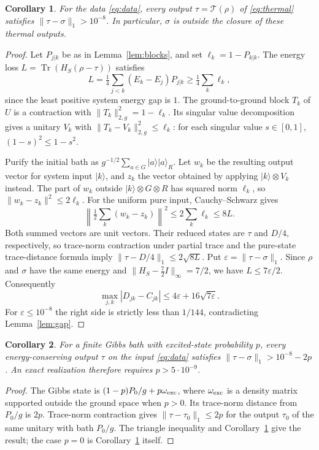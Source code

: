 \documentclass[11pt]{article}
\newtheorem{corollary}{Corollary}
\newcommand{\Tr}{\operatorname{Tr}}
\newcommand{\ket}[1]{\lvert #1\rangle}
\begin{document}
\begin{corollary}\label{cor:robust}
For the data \eqref{eq:data}, every output $\tau=\mathcal T(\rho)$
of \eqref{eq:thermal} satisfies $\|\tau-\sigma\|_1>10^{-8}$.
In particular, $\sigma$ is outside the closure of these thermal outputs.
\end{corollary}
\begin{proof}
Let $P_{j|k}$ be as in Lemma~\ref{lem:blocks}, and set
$\ell_k=1-P_{k|k}$. The energy loss
$L=\Tr(H_S(\rho-\tau))$ satisfies
\[
L=\tfrac14\sum_{j<k}(E_k-E_j)P_{j|k}
\geq\tfrac14\sum_k\ell_k,
\]
since the least positive system energy gap is $1$.
The ground-to-ground block $T_k$ of $U$ is a contraction
with $\|T_k\|_{2,g}^2=1-\ell_k$.
Its singular value decomposition gives a unitary $V_k$ with
$\|T_k-V_k\|_{2,g}^2\leq\ell_k$: for each singular value $s\in[0,1]$,
$(1-s)^2\leq1-s^2$.

Purify the initial bath as $g^{-1/2}\sum_{a\in G}\ket a\ket a_R$.
Let $w_k$ be the resulting output vector for system input $\ket k$,
and $z_k$ the vector obtained by applying $\ket k\otimes V_k$ instead.
The part of $w_k$ outside $\ket k\otimes G\otimes R$ has squared norm
$\ell_k$, so $\|w_k-z_k\|^2\leq2\ell_k$.
For the uniform pure input, Cauchy--Schwarz gives
\[
\left\|\tfrac12\sum_k(w_k-z_k)\right\|^2
\leq2\sum_k\ell_k\leq8L.
\]
Both summed vectors are unit vectors. Their reduced states are $\tau$
and $D/4$, respectively, so trace-norm contraction under partial trace
and the pure-state trace-distance formula imply
$\|\tau-D/4\|_1\leq2\sqrt{8L}$.
Put $\varepsilon=\|\tau-\sigma\|_1$.
Since $\rho$ and $\sigma$ have the same energy and
$\|H_S-\tfrac72I\|_\infty=7/2$, we have $L\leq7\varepsilon/2$.
Consequently
\[
\max_{j,k}|D_{jk}-C_{jk}|
\leq4\varepsilon+16\sqrt{7\varepsilon}.
\]
For $\varepsilon\leq10^{-8}$ the right side is strictly less than
$1/144$, contradicting Lemma~\ref{lem:gap}.
\end{proof}

\begin{corollary}\label{cor:tail}
For a finite Gibbs bath with excited-state probability $p$, every
energy-conserving output $\tau$ on the input \eqref{eq:data} satisfies
$\|\tau-\sigma\|_1>10^{-8}-2p$.
An exact realization therefore requires $p>5\cdot10^{-9}$.
\end{corollary}
\begin{proof}
The Gibbs state is $(1-p)P_0/g+p\omega_{\rm exc}$, where
$\omega_{\rm exc}$ is a density matrix supported outside the ground space
when $p>0$. Its trace-norm distance from $P_0/g$ is $2p$.
Trace-norm contraction gives $\|\tau-\tau_0\|_1\leq2p$ for the output
$\tau_0$ of the same unitary with bath $P_0/g$.
The triangle inequality and Corollary~\ref{cor:robust} give the result;
the case $p=0$ is Corollary~\ref{cor:robust} itself.
\end{proof}
\end{document}
